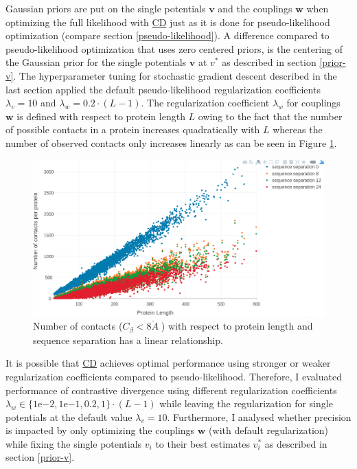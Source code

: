 \documentclass[12pt,a4paper,twoside]{book}
\newcommand{\Cb}{C_\beta}
\newcommand{\eq}{\!=\!}
\renewcommand{\v}{\mathbf{v}}
\newcommand{\vi}{v_{i}}
\newcommand{\w}{\mathbf{w}}
\newcommand{\angstrom}{\mathring{A} \;}
\theoremstyle{definition}
\theoremstyle{definition}
\theoremstyle{remark}
\begin{document}
Gaussian priors are put on the single potentials \(\v\) and the
couplings \(\w\) when optimizing the full likelihood with
\protect\hyperlink{abbrev}{CD} just as it is done for pseudo-likelihood
optimization (compare section \ref{pseudo-likelihood}). A difference
compared to pseudo-likelihood optimization that uses zero centered
priors, is the centering of the Gaussian prior for the single potentials
\(\v\) at \(v^*\) as described in section \ref{prior-v}. The
hyperparameter tuning for stochastic gradient descent described in the
last section applied the default pseudo-likelihood regularization
coefficients \(\lambda_v \eq 10\) and \(\lambda_w \eq 0.2\cdot(L-1)\).
The regularization coefficient \(\lambda_w\) for couplings \(\w\) is
defined with respect to protein length \(L\) owing to the fact that the
number of possible contacts in a protein increases quadratically with
\(L\) whereas the number of observed contacts only increases linearly as
can be seen in Figure \ref{fig:number-contacts-against-L}.





\begin{figure}

{\centering \includegraphics[width=0.9\linewidth]{img/full_likelihood/no_contacts_vs_protein_length_thr8} 

}

\caption{Number of contacts
(\(\Cb < 8 \angstrom\)) with respect to protein length and sequence
separation has a linear relationship.}\label{fig:number-contacts-against-L}
\end{figure}

It is possible that \protect\hyperlink{abbrev}{CD} achieves optimal
performance using stronger or weaker regularization coefficients
compared to pseudo-likelihood. Therefore, I evaluated performance of
contrastive divergence using different regularization coefficients
\(\lambda_w \in \{ 1\mathrm{e}{-2}, 1\mathrm{e}{-1}, 0.2, 1\} \cdot(L-1)\)
while leaving the regularization for single potentials at the default
value \(\lambda_v \eq 10\). Furthermore, I analysed whether precision is
impacted by only optimizing the couplings \(\w\) (with default
regularization) while fixing the single potentials \(\vi\) to their best
estimates \(\vi^*\) as described in section \ref{prior-v}.
\end{document}
